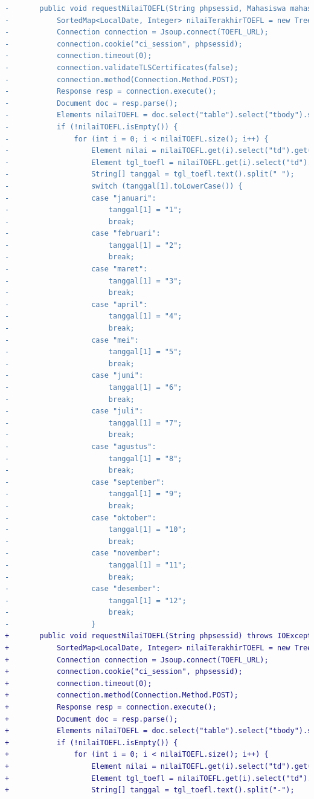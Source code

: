\begin{itemize}
\begin{lstlisting}[language=diff, caption=Perubahan Implementasi Jsoup TOEFL, label=diff_toefl]
-       public void requestNilaiTOEFL(String phpsessid, Mahasiswa mahasiswa) throws IOException {
-           SortedMap<LocalDate, Integer> nilaiTerakhirTOEFL = new TreeMap<>();
-           Connection connection = Jsoup.connect(TOEFL_URL);
-           connection.cookie("ci_session", phpsessid);
-           connection.timeout(0);
-           connection.validateTLSCertificates(false);
-           connection.method(Connection.Method.POST);
-           Response resp = connection.execute();
-           Document doc = resp.parse();
-           Elements nilaiTOEFL = doc.select("table").select("tbody").select("tr");
-           if (!nilaiTOEFL.isEmpty()) {
-               for (int i = 0; i < nilaiTOEFL.size(); i++) {
-                   Element nilai = nilaiTOEFL.get(i).select("td").get(5);
-                   Element tgl_toefl = nilaiTOEFL.get(i).select("td").get(1);
-                   String[] tanggal = tgl_toefl.text().split(" ");
-                   switch (tanggal[1].toLowerCase()) {
-                   case "januari":
-                       tanggal[1] = "1";
-                       break;
-                   case "februari":
-                       tanggal[1] = "2";
-                       break;
-                   case "maret":
-                       tanggal[1] = "3";
-                       break;
-                   case "april":
-                       tanggal[1] = "4";
-                       break;
-                   case "mei":
-                       tanggal[1] = "5";
-                       break;
-                   case "juni":
-                       tanggal[1] = "6";
-                       break;
-                   case "juli":
-                       tanggal[1] = "7";
-                       break;
-                   case "agustus":
-                       tanggal[1] = "8";
-                       break;
-                   case "september":
-                       tanggal[1] = "9";
-                       break;
-                   case "oktober":
-                       tanggal[1] = "10";
-                       break;
-                   case "november":
-                       tanggal[1] = "11";
-                       break;
-                   case "desember":
-                       tanggal[1] = "12";
-                       break;
-                   }
+       public void requestNilaiTOEFL(String phpsessid) throws IOException {
+           SortedMap<LocalDate, Integer> nilaiTerakhirTOEFL = new TreeMap<>();
+           Connection connection = Jsoup.connect(TOEFL_URL);
+           connection.cookie("ci_session", phpsessid);
+           connection.timeout(0);
+           connection.method(Connection.Method.POST);
+           Response resp = connection.execute();
+           Document doc = resp.parse();
+           Elements nilaiTOEFL = doc.select("table").select("tbody").select("tr");
+           if (!nilaiTOEFL.isEmpty()) {
+               for (int i = 0; i < nilaiTOEFL.size(); i++) {
+                   Element nilai = nilaiTOEFL.get(i).select("td").get(5);
+                   Element tgl_toefl = nilaiTOEFL.get(i).select("td").get(1);
+                   String[] tanggal = tgl_toefl.text().split("-");


\end{lstlisting}
\end{itemize}
